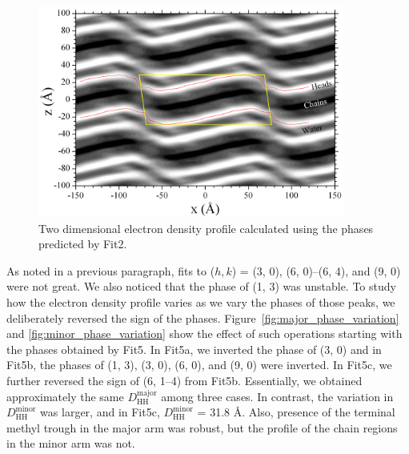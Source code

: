 \begin{figure}[htbp]
  \centering
  \includegraphics[width=0.9\textwidth]{figures/ripple/LAXS/Fit2_2D_edp}
  \caption[Two dimensional electron density map calculated using the phases
  predicted by Fit2]
  {Two dimensional electron density profile calculated using the phases
  predicted by Fit2.}
  \label{fig:Fit2_2D_edp}
\end{figure}

As noted in a previous paragraph, fits to ($h, k$) = (3, 0), (6, 0)--(6, 4),
and (9, 0) were not great. We also noticed that the phase of (1, 3) was unstable. To study
how the electron density profile varies as we vary the phases of those peaks,
we deliberately reversed the sign of the phases. Figure~\ref{fig:major_phase_variation}
and \ref{fig:minor_phase_variation} show the effect of such operations
starting with the phases obtained by Fit5. 
In Fit5a, we inverted the phase of (3, 0) and in Fit5b, the phases of 
(1, 3), (3, 0), (6, 0), and (9, 0) were inverted.
In Fit5c, we further reversed the sign of (6, 1--4) from Fit5b.
Essentially, we obtained approximately the same $D_\text{HH}^\text{major}$
among three cases. In contrast, the variation in $D_\text{HH}^\text{minor}$ was
larger, and in Fit5c, $D_\text{HH}^\text{minor}$ = 31.8 \AA.
Also, presence of the terminal methyl trough in the major arm was robust, but
the profile of the chain regions in the minor arm was not.


